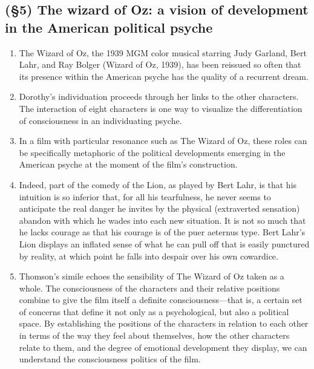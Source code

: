 \subsection{(\S5) The wizard of Oz: a vision of development in the American political psyche}

\begin{enumerate}

\item {} The Wizard
of Oz, the 1939 MGM color musical starring Judy Garland, Bert Lahr, and Ray
Bolger (Wizard of Oz, 1939), has been reissued so often that its presence
within the American psyche has the quality of a recurrent dream.

\item {}
Dorothy's individuation proceeds through her links to the other characters.
The interaction of eight characters is one way to visualize the differentiation
of consciousness in an individuating psyche.

\item {} In a film with particular resonance
such as The Wizard of Oz, these roles can be specifically metaphoric of the
political developments emerging in the American psyche at the moment of the
film's construction.

\item {} Indeed, part of the comedy of the Lion, as played by Bert
Lahr, is that his intuition is so inferior that, for all his tearfulness, he
never seems to anticipate the real danger he invites by the physical
(extraverted sensation) abandon with which he wades into each new situation. It
is not so much that he lacks courage as that his courage is of the puer
aeternus type. Bert Lahr’s Lion displays an inflated sense of what he can pull
off that is easily punctured by reality, at which point he falls into despair
over his own cowardice.

\item {} Thomson’s simile echoes the sensibility of The Wizard of
Oz taken as a whole. The consciousness of the characters and their relative
positions combine to give the film itself a definite consciousness—that is, a
certain set of concerns that define it not only as a psychological, but also a
political space. By establishing the positions of the characters in relation to
each other in terms of the way they feel about themselves, how the other
characters relate to them, and the degree of emotional development they
display, we can understand the consciousness politics of the film.


\end{enumerate}

